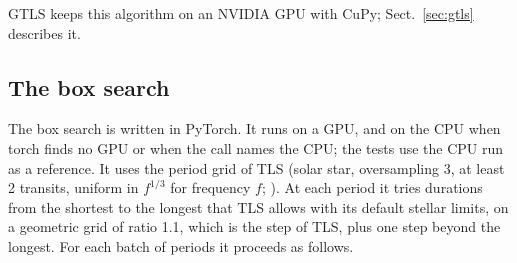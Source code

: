 \documentclass{aastex631}
\begin{document}
GTLS \citep{Hu2026} keeps this algorithm on an NVIDIA GPU with CuPy; Sect.~\ref{sec:gtls} describes it.

\subsection{The box search}\label{sec:box}
The box search is written in PyTorch. It runs on a GPU, and on the CPU when torch finds no GPU or when the call names the CPU; the tests use the CPU run as a reference. It uses the period grid of TLS (solar star, oversampling 3, at least 2 transits, uniform in $f^{1/3}$ for frequency $f$; \citealt{Ofir2014}). At each period it tries durations from the shortest to the longest that TLS allows with its default stellar limits, on a geometric grid of ratio 1.1, which is the step of TLS, plus one step beyond the longest. For each batch of periods it proceeds as follows.
\end{document}
